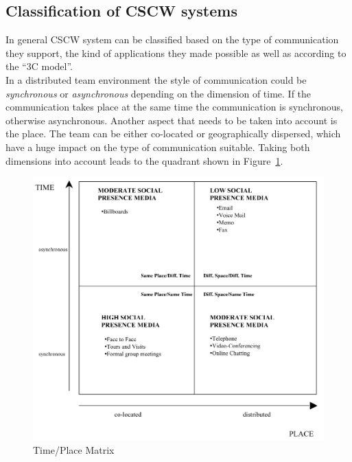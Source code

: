 
\subsection{Classification of \gls{CSCW} systems}
\label{sec:cscw_types}

In general \gls{CSCW} system can be classified based on the type of communication they support, the kind of applications they made possible as well as according to the ``3C model''. \\

In a distributed team environment the style of communication could be \emph{synchronous} or \emph{asynchronous} depending on the dimension of time. If the communication takes place at the same time the communication is synchronous, otherwise asynchronous. Another aspect that needs to be taken into account is the place. The team can be either co-located or geographically dispersed, which have a huge impact on the type of communication suitable. Taking both dimensions into account leads to the quadrant shown in Figure~\ref{fig:images_cscw_time_place_matrix}. \\

\begin{figure}[!ht]
 \centering
 \includegraphics[width=0.9\columnwidth]{images/time_place_matrix.png}
 \caption[Time/Place Matrix]{Time/Place Matrix \citep{robert2005paradox}}
\label{fig:images_cscw_time_place_matrix}
\end{figure}

